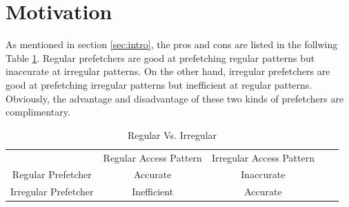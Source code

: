 \section{Motivation}
\label{sec:motivation}
As mentioned in section \ref{sec:intro}, the pros and cons are listed in the follwing Table \ref{table:regVsirreg}.
Regular prefetchers are good at prefetching regular patterns but inaccurate at irregular patterns. On the other hand, irregular prefetchers are good at prefetching irregular patterns but inefficient at regular patterns. Obviously, the advantage and disadvantage of these two kinds of prefetchers are complimentary.

\begin{table}[ht!]
\centering
\begin{tabular}{cccll}
\cline{1-3}
\multicolumn{1}{|c|}{}                     & \multicolumn{1}{c|}{Regular Access Pattern}             & \multicolumn{1}{c|}{Irregular Access Pattern}          &  &  \\ \cline{1-3}
\multicolumn{1}{|c|}{Regular Prefetcher}   & \multicolumn{1}{c|}{Accurate}              & \multicolumn{1}{c|}{{\color[HTML]{FE0000} Inaccurate}} &  &  \\ \cline{1-3}
\multicolumn{1}{|c|}{Irregular Prefetcher} & \multicolumn{1}{c|}{{\color[HTML]{FE0000} Inefficient}} & \multicolumn{1}{c|}{Accurate} &  &  \\ \cline{1-3}
\end{tabular}
\caption{Regular Vs. Irregular}
\label{table:regVsirreg}
\end{table}

